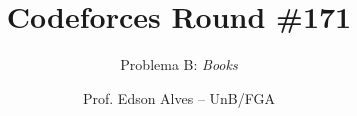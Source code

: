 \title{Codeforces Round \#171}
\subtitle{Problema B: {\it Books}}
\author{Prof. Edson Alves -- UnB/FGA}
\date{}
